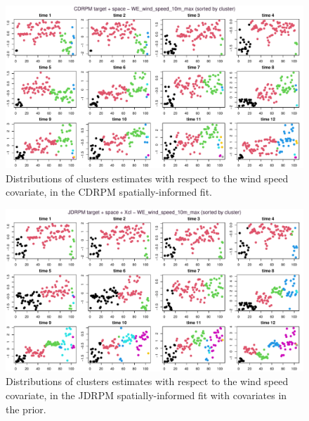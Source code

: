 \documentclass[12pt,	%
	a4paper,		%
	twoside,		%
	openright,		%
	titlepage,%
	]{book}
\theoremstyle{definition}
\begin{document}
\begin{figure}[!ht]
    \centering
    \includegraphics[width=1\linewidth]{Testing/Covariates/in clustering/space C/WE_wind_speed_10m_max_sorted.pdf}
    \caption[Distributions of clusters estimates with respect to the wind speed covariate, CDRPM spatially-informed fit]{Distributions of clusters estimates with respect to the wind speed covariate, in the CDRPM spatially-informed fit.}
    \label{fig: C wind max sorted by cl}
\end{figure}


\begin{figure}[!ht]
    \centering
    \includegraphics[width=1\linewidth]{Testing/Covariates/in clustering/space J Xcl/WE_wind_speed_10m_max_sorted.pdf}
    \caption[Distributions of clusters estimates with respect to the wind speed covariate, JDRPM spatially-informed fit with covariates in the prior]{Distributions of clusters estimates with respect to the wind speed covariate, in the JDRPM spatially-informed fit with covariates in the prior.}
    \label{fig: JXcl wind max sorted by cl}
\end{figure}
\end{document}
